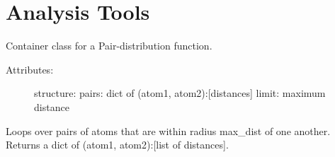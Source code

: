 \documentclass[letterpaper,10pt,english]{sphinxmanual}
\begin{document}

\begin{fulllineitems}
\label{models:qmpy.Point}
\end{fulllineitems}


\begin{fulllineitems}
\label{models:qmpy.Axis}
\end{fulllineitems}



\section{Analysis Tools}
\label{models:analysis-tools}

\begin{fulllineitems}
\label{models:qmpy.PDF}
Container class for a Pair-distribution function.
\begin{description}
\item[{Attributes:}] \leavevmode
structure: {\hyperref[models:qmpy.Structure]{}}
pairs: dict of (atom1, atom2):{[}distances{]}
limit: maximum distance

\end{description}

\begin{fulllineitems}
\label{models:qmpy.PDF.get_pair_distances}
Loops over pairs of atoms that are within radius max\_dist of one another.
Returns a dict of (atom1, atom2):{[}list of distances{]}.

\end{fulllineitems}


\end{fulllineitems}

\end{document}
